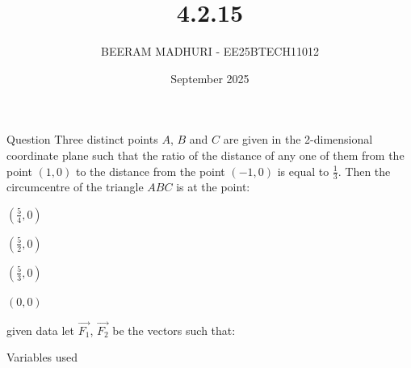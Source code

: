 \documentclass{beamer}
\title %
{4.2.15}
\date{September  2025}
\author %
{BEERAM MADHURI - EE25BTECH11012}
\begin{document}
\frame{\titlepage}
\begin{frame}{Question}
Three distinct points $A$, $B$ and $C$ are given in the 2-dimensional coordinate plane such that the ratio of the distance of any one of them from the point $(1,0)$ to the distance from the point $(-1,0)$ is equal to $\frac{1}{3}$. Then the circumcentre of the triangle $ABC$ is at the point:
\begin{enumerate}
\begin{multicols}{4}
\item $\left(\frac{5}{4}, 0\right)$
\item $\left(\frac{5}{2}, 0\right)$
\item $\left(\frac{5}{3}, 0\right)$
\item $(0, 0)$
\end{multicols}
\end{enumerate}
\end{frame}
 
\begin{frame}{given data}
 let $\vec{F_1}$, $\vec{F_2}$ be the vectors such that:
\begin{table}[h!]
    \centering
    
    \caption{Variables used}
    \label{table 1.9.1}
\end{table}
\end{frame}
\end{document}
